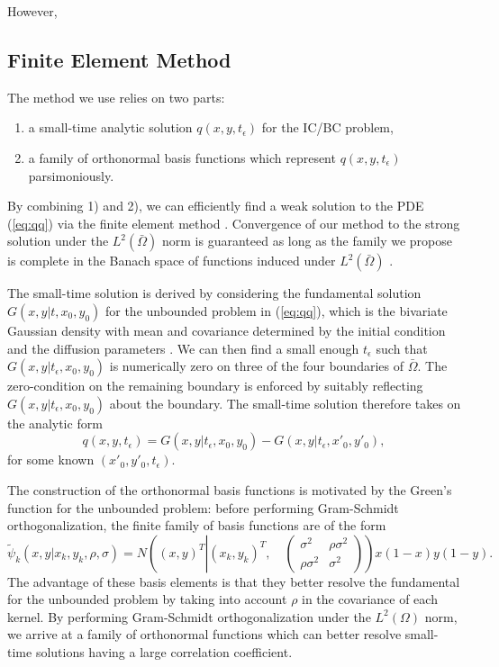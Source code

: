 \documentclass[10pt]{article}
\begin{document}
However, 

\subsection{Finite Element Method}
The method we use relies on two parts:
\begin{enumerate}
\item a small-time analytic solution $q(x,y,t_\epsilon)$ for the IC/BC problem,
\item a family of orthonormal basis functions which represent
  $q(x,y,t_\epsilon)$ parsimoniously.
\end{enumerate}
By combining 1) and 2), we can efficiently find a weak solution to the
PDE (\ref{eq:qq}) via the finite element method
\citep{shaidurov2013multigrid}. Convergence of our method to the
strong solution under the $L^2(\bar{\Omega})$ norm is guaranteed as
long as the family we propose is complete in the Banach space of
functions induced under $L^2(\bar{\Omega})$ \citep{salsa2016partial}.

The small-time solution is derived by considering the fundamental
solution $G(x,y |t, x_0, y_0)$ for the unbounded problem in
(\ref{eq:qq}), which is the bivariate Gaussian density with mean and
covariance determined by the initial condition and the diffusion
parameters \citep{stakgold2011green}. We can then find a small enough
$t_\epsilon$ such that $G(x,y|t_\epsilon,x_0, y_0)$ is numerically
zero on three of the four boundaries of $\bar{\Omega}$. The
zero-condition on the remaining boundary is enforced by suitably
reflecting $G(x,y|t_\epsilon,x_0, y_0)$ about the boundary. The
small-time solution therefore takes on the analytic form
\[
  q(x,y,t_\epsilon) = G(x,y|t_\epsilon,x_0, y_0) - G(x,y|t_\epsilon,x'_0, y'_0),
\]
for some known $(x'_0, y'_0, t_\epsilon)$.

The construction of the orthonormal basis functions is motivated by
the Green's function for the unbounded problem: before performing
Gram-Schmidt orthogonalization, the finite family of basis functions
are of the form
\[
  \tilde{\psi}_k(x,y| x_k, y_k, \rho, \sigma) = N\left( (x,y)^T \left|
      (x_k, y_k)^T , \quad \left( \begin{array}{cc}
                                     \sigma^2 & \rho \sigma^2 \\
                                     \rho \sigma^2 & \sigma^2
                     \end{array} \right) \right. \right) x(1-x)y(1-y).
\]
The advantage of these basis elements is that they better resolve the
fundamental for the unbounded problem by taking into account $\rho$ in
the covariance of each kernel. By performing Gram-Schmidt
orthogonalization under the $L^2(\Omega)$ norm, we arrive at a family
of orthonormal functions which can better resolve small-time solutions
having a large correlation coefficient.
\end{document}
